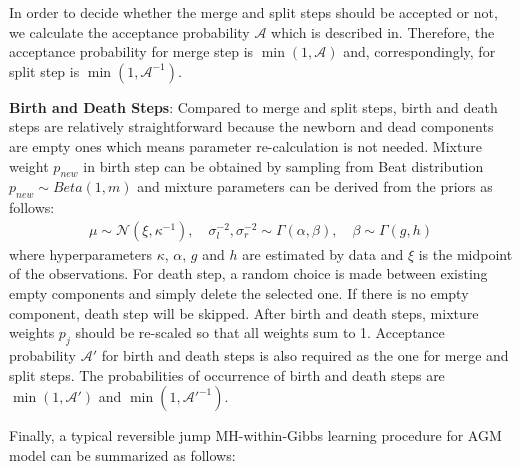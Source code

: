 \documentclass[conference]{IEEEtran}
\begin{document}
In order to decide whether the merge and split steps should be accepted or not, we calculate the acceptance probability $\mathcal{A}$ which is described in\cite{b1}. Therefore, the acceptance probability for merge step is $\min(1,\mathcal{A})$ and, correspondingly, for split step is $\min(1,\mathcal{A}^{-1})$.

\textbf{Birth and Death Steps}: Compared to merge and split steps, birth and death steps are relatively straightforward because the newborn and dead components are empty ones which means parameter re-calculation is not needed. Mixture weight $p_{new}$ in birth step can be obtained by sampling from Beat distribution $p_{new} \sim Beta(1,m)$ and mixture parameters can be derived from the priors as follows\cite{casella}:
\begin{align}
\mu \sim \mathcal{N}(\xi,\kappa^{-1}), \quad \sigma_{l}^{-2},\sigma_{r}^{-2} \sim \Gamma(\alpha,\beta), \quad \beta \sim \Gamma(g,h)
\label{eq:prior}
\end{align}
where hyperparameters $\kappa$, $\alpha$, $g$ and $h$ are estimated by data and $\xi$ is the midpoint of the observations. For death step, a random choice is made between existing empty components and simply delete the selected one. If there is no empty component, death step will be skipped. After birth and death steps, mixture weights $p_j$ should be re-scaled so that all weights sum to 1. Acceptance probability $\mathcal{A}'$ for birth and death steps is also required as the one for merge and split steps. The probabilities of occurrence of birth and death steps are $\min(1,\mathcal{A}')$ and $\min(1,\mathcal{A}'^{-1})$\cite{b1}.

Finally, a typical reversible jump MH-within-Gibbs learning procedure for AGM model can be summarized as follows:
\bigskip
\end{document}
